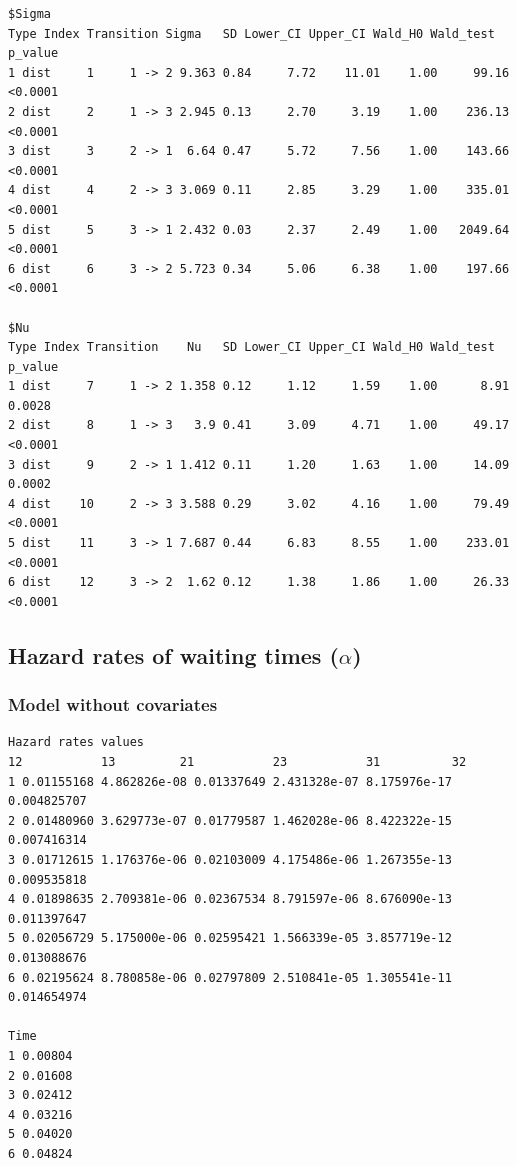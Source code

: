 \documentclass[11pt]{article}
\begin{document}
\begin{verbatim}
$Sigma
Type Index Transition Sigma   SD Lower_CI Upper_CI Wald_H0 Wald_test p_value
1 dist     1     1 -> 2 9.363 0.84     7.72    11.01    1.00     99.16 <0.0001
2 dist     2     1 -> 3 2.945 0.13     2.70     3.19    1.00    236.13 <0.0001
3 dist     3     2 -> 1  6.64 0.47     5.72     7.56    1.00    143.66 <0.0001
4 dist     4     2 -> 3 3.069 0.11     2.85     3.29    1.00    335.01 <0.0001
5 dist     5     3 -> 1 2.432 0.03     2.37     2.49    1.00   2049.64 <0.0001
6 dist     6     3 -> 2 5.723 0.34     5.06     6.38    1.00    197.66 <0.0001

$Nu
Type Index Transition    Nu   SD Lower_CI Upper_CI Wald_H0 Wald_test p_value
1 dist     7     1 -> 2 1.358 0.12     1.12     1.59    1.00      8.91  0.0028
2 dist     8     1 -> 3   3.9 0.41     3.09     4.71    1.00     49.17 <0.0001
3 dist     9     2 -> 1 1.412 0.11     1.20     1.63    1.00     14.09  0.0002
4 dist    10     2 -> 3 3.588 0.29     3.02     4.16    1.00     79.49 <0.0001
5 dist    11     3 -> 1 7.687 0.44     6.83     8.55    1.00    233.01 <0.0001
6 dist    12     3 -> 2  1.62 0.12     1.38     1.86    1.00     26.33 <0.0001
\end{verbatim}


\subsection{Hazard rates of waiting times ($\alpha$)}

\subsubsection{Model without covariates}

\begin{verbatim}
Hazard rates values 
12           13         21           23           31          32
1 0.01155168 4.862826e-08 0.01337649 2.431328e-07 8.175976e-17 0.004825707
2 0.01480960 3.629773e-07 0.01779587 1.462028e-06 8.422322e-15 0.007416314
3 0.01712615 1.176376e-06 0.02103009 4.175486e-06 1.267355e-13 0.009535818
4 0.01898635 2.709381e-06 0.02367534 8.791597e-06 8.676090e-13 0.011397647
5 0.02056729 5.175000e-06 0.02595421 1.566339e-05 3.857719e-12 0.013088676
6 0.02195624 8.780858e-06 0.02797809 2.510841e-05 1.305541e-11 0.014654974

Time
1 0.00804
2 0.01608
3 0.02412
4 0.03216
5 0.04020
6 0.04824
\end{verbatim}
\end{document}
